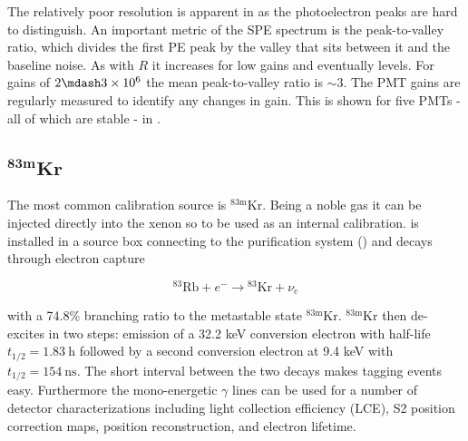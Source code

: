 The relatively poor resolution is apparent in  as the photoelectron peaks are hard to distinguish.  An
important metric of the SPE spectrum is the peak-to-valley ratio, which divides the first PE peak by the valley that sits between it and
the baseline noise.  As with $R$ it increases for low gains and eventually levels.  For gains of $2 \mdash 3 \times 10^{6}$ the mean
peak-to-valley ratio is ${\sim} 3$.  The PMT gains are regularly measured to identify any changes in gain.  This is shown for five
PMTs - all of which are stable - in .



\subsection{$\mathbf{^{83m}Kr}$}
\label{subsec:det_char_kr}
The most common calibration source is $\mathrm{^{83m}Kr}$.  Being a noble gas it can be injected directly into the xenon so to be used as an
internal calibration.   is installed in a source box connecting to the purification system
() and decays through electron capture

\begin{equation}
\mathrm{^{83}Rb} + e^- \rightarrow \mathrm{^{83}Kr} + \nu_e
\end{equation}

\noindent with a 74.8\% branching ratio to the metastable state $\mathrm{^{83m}Kr}$.  $\mathrm{^{83m}Kr}$ then de-excites in two steps:
emission of a 32.2 keV
conversion electron with half-life $t_{1/2} = 1.83\ \mathrm{h}$ followed by a second conversion electron at 9.4 keV with
$t_{1/2} = 154\ \mathrm{ns}$.  The short
interval between the two decays makes tagging events easy.  Furthermore the mono-energetic $\gamma$ lines can be used for a number of
detector characterizations including light collection efficiency (LCE), S2 position correction maps, position reconstruction, and electron
lifetime.

